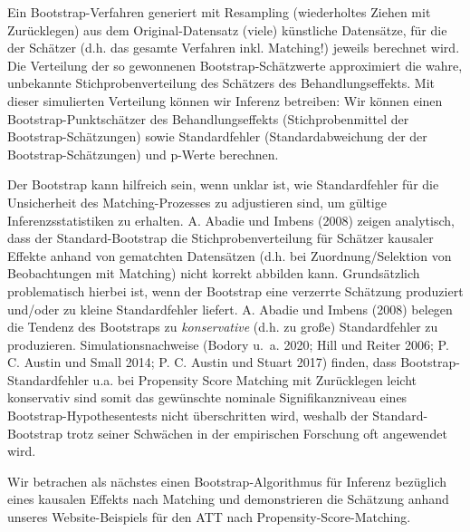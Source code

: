 \documentclass[
  a4paper,
  DIV=11,
  oneside]{scrreprt}
\begin{document}
Ein Bootstrap-Verfahren generiert mit Resampling (wiederholtes Ziehen
mit Zurücklegen) aus dem Original-Datensatz (viele) künstliche
Datensätze, für die der Schätzer (d.h. das gesamte Verfahren inkl.
Matching!) jeweils berechnet wird. Die Verteilung der so gewonnenen
Bootstrap-Schätzwerte approximiert die wahre, unbekannte
Stichprobenverteilung des Schätzers des Behandlungseffekts. Mit dieser
simulierten Verteilung können wir Inferenz betreiben: Wir können einen
Bootstrap-Punktschätzer des Behandlungseffekts (Stichprobenmittel der
Bootstrap-Schätzungen) sowie Standardfehler (Standardabweichung der der
Bootstrap-Schätzungen) und p-Werte berechnen.

Der Bootstrap kann hilfreich sein, wenn unklar ist, wie Standardfehler
für die Unsicherheit des Matching-Prozesses zu adjustieren sind, um
gültige Inferenzsstatistiken zu erhalten. A. Abadie und Imbens (2008)
zeigen analytisch, dass der Standard-Bootstrap die Stichprobenverteilung
für Schätzer kausaler Effekte anhand von gematchten Datensätzen (d.h.
bei Zuordnung/Selektion von Beobachtungen mit Matching) nicht korrekt
abbilden kann. Grundsätzlich problematisch hierbei ist, wenn der
Bootstrap eine verzerrte Schätzung produziert und/oder zu kleine
Standardfehler liefert. A. Abadie und Imbens (2008) belegen die Tendenz
des Bootstraps zu \emph{konservative} (d.h. zu große) Standardfehler zu
produzieren. Simulationsnachweise (Bodory u.~a. 2020; Hill und Reiter
2006; P. C. Austin und Small 2014; P. C. Austin und Stuart 2017) finden,
dass Bootstrap-Standardfehler u.a. bei Propensity Score Matching mit
Zurücklegen leicht konservativ sind somit das gewünschte nominale
Signifikanzniveau eines Bootstrap-Hypothesentests nicht überschritten
wird, weshalb der Standard-Bootstrap trotz seiner Schwächen in der
empirischen Forschung oft angewendet wird.

Wir betrachen als nächstes einen Bootstrap-Algorithmus für Inferenz
bezüglich eines kausalen Effekts nach Matching und demonstrieren die
Schätzung anhand unseres Website-Beispiels für den ATT nach
Propensity-Score-Matching.
\end{document}
